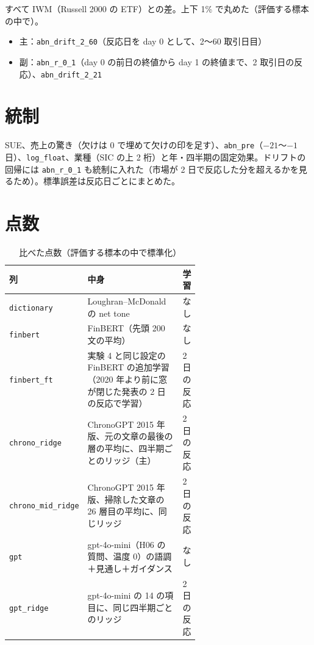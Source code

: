 \documentclass[xelatex,ja=standard,jafont=haranoaji,a4paper,10pt,openany]{bxjsreport}
\newcommand{\code}[1]{\texttt{#1}}
\begin{document}
すべて IWM（Russell 2000 の ETF）との差。上下 1\% で丸めた（評価する標本の中で）。

\begin{itemize}
\item 主：\code{abn\_drift\_2\_60}（反応日を day 0 として、2〜60 取引日目）
\item 副：\code{abn\_r\_0\_1}（day 0 の前日の終値から day 1 の終値まで、2 取引日の反応）、\code{abn\_drift\_2\_21}
\end{itemize}

\section{統制}

SUE、売上の驚き（欠けは 0 で埋めて欠けの印を足す）、\code{abn\_pre}（$-21$〜$-1$ 日）、\code{log\_float}、業種（SIC の上 2 桁）と年・四半期の固定効果。ドリフトの回帰には \code{abn\_r\_0\_1} も統制に入れた（市場が 2 日で反応した分を超えるかを見るため）。標準誤差は反応日ごとにまとめた。

\section{点数}

\begin{table}[H]
\centering\small
\caption{比べた点数（評価する標本の中で標準化）}
\label{tab:scores}
\begin{tabular}{@{}lp{0.62\linewidth}l@{}}
\toprule
列 & 中身 & 学習 \\
\midrule
\code{dictionary} & Loughran--McDonald の net tone & なし \\
\code{finbert} & FinBERT（先頭 200 文の平均） & なし \\
\code{finbert\_ft} & 実験 4 と同じ設定の FinBERT の追加学習（2020 年より前に窓が閉じた発表の 2 日の反応で学習） & 2 日の反応 \\
\code{chrono\_ridge} & ChronoGPT 2015 年版、元の文章の最後の層の平均に、四半期ごとのリッジ（主） & 2 日の反応 \\
\code{chrono\_mid\_ridge} & ChronoGPT 2015 年版、掃除した文章の 26 層目の平均に、同じリッジ & 2 日の反応 \\
\code{gpt} & gpt-4o-mini（H06 の質問、温度 0）の語調＋見通し＋ガイダンス & なし \\
\code{gpt\_ridge} & gpt-4o-mini の 14 の項目に、同じ四半期ごとのリッジ & 2 日の反応 \\
\bottomrule
\end{tabular}
\end{table}
\end{document}
